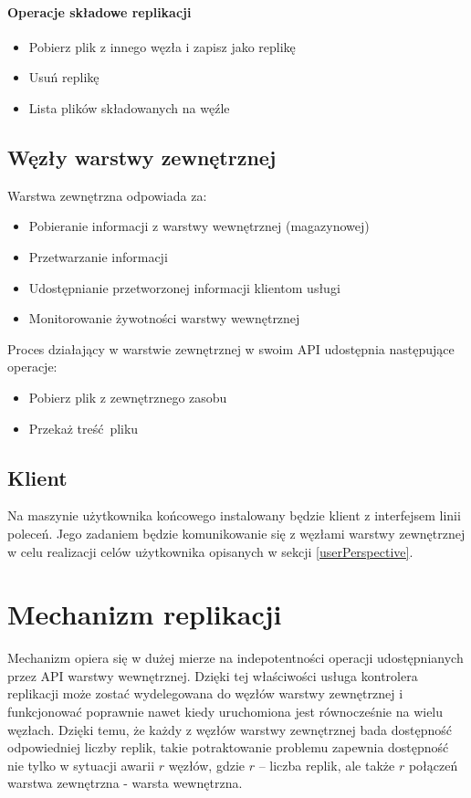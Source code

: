 \documentclass[a4paper,11pt]{article}
\begin{document}
\paragraph{Operacje składowe replikacji}
\begin{itemize}
  \item Pobierz plik z innego węzła i zapisz jako replikę
  \item Usuń replikę
  \item Lista plików składowanych na węźle
\end{itemize}

\subsection{Węzły warstwy zewnętrznej}
Warstwa zewnętrzna odpowiada za:
\begin{itemize}
  \item Pobieranie informacji z warstwy wewnętrznej (magazynowej)
  \item Przetwarzanie informacji
  \item Udostępnianie przetworzonej informacji klientom usługi
  \item Monitorowanie żywotności warstwy wewnętrznej
\end{itemize}

Proces działający w warstwie zewnętrznej w swoim API udostępnia
następujące operacje:
\begin{itemize}
  \item Pobierz plik z zewnętrznego zasobu
  \item Przekaż treść pliku
\end{itemize}

%
%

\subsection{Klient}
Na maszynie użytkownika końcowego instalowany będzie klient z
interfejsem linii poleceń.  Jego zadaniem będzie komunikowanie się z
węzłami warstwy zewnętrznej w celu realizacji celów użytkownika
opisanych w sekcji \ref{userPerspective}.

\section{Mechanizm replikacji}
Mechanizm opiera się w dużej mierze na indepotentności operacji
udostępnianych przez API warstwy wewnętrznej.  Dzięki tej właściwości
usługa kontrolera replikacji może zostać wydelegowana do węzłów warstwy
zewnętrznej i funkcjonować poprawnie nawet kiedy uruchomiona jest
równocześnie na wielu węzłach.  Dzięki temu, że każdy z węzłów warstwy
zewnętrznej bada dostępność odpowiedniej liczby replik, takie
potraktowanie problemu zapewnia dostępność nie tylko w sytuacji awarii
$r$ węzłów, gdzie $r$ -- liczba replik, ale także $r$ połączeń warstwa
zewnętrzna - warsta wewnętrzna.
\end{document}

